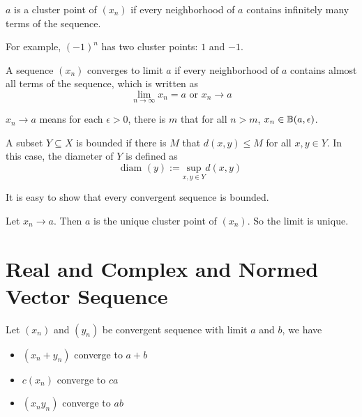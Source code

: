 \begin{definition}
    $a$ is a cluster point of $(x_n)$ if every neighborhood of $a$ contains infinitely many terms of the sequence.
    
    For example, $(-1)^n$ has two cluster points: $1$ and $-1$.
\end{definition}

\begin{definition}[limit]
    A sequence $(x_n)$ converges to limit $a$ if every neighborhood of $a$ contains almost all terms of the sequence, which is written as
    \begin{equation}
        \lim_{n \rightarrow \infty} x_n = a \text{    or    } x_n \rightarrow a
    \end{equation}
\end{definition}

\begin{theorem}
    $x_n \rightarrow a$ means for each $\epsilon>0$, there is $m$ that for all $n > m$, $x_n \in \mathbb{B}(a, \epsilon)$.
\end{theorem}

\begin{definition}[bounded]
    A subset $Y \subseteq X$ is bounded if there is $M$ that $d(x,y) \leq M$ for all $x,y \in Y$. In this case, the diameter of $Y$ is defined as
    \begin{equation}
        \text{diam }(y) := \underset{x,y \in Y}{\text{sup}} d(x,y)
    \end{equation}
    
    It is easy to show that every convergent sequence is bounded.
\end{definition}

\begin{theorem}
    Let $x_n \rightarrow a$. Then $a$ is the unique cluster point of $(x_n)$. So the limit is unique.
\end{theorem}





%
%
%
%

\section{Real and Complex and Normed Vector Sequence}

\begin{theorem}
    Let $(x_n)$ and $(y_n)$ be convergent sequence with limit $a$ and $b$, we have
    \begin{itemize}
        \item $(x_n + y_n)$ converge to $a + b$
        \item $c (x_n)$ converge to $ca$
        \item $(x_n y_n)$ converge to $ab$
    \end{itemize}
\end{theorem}

